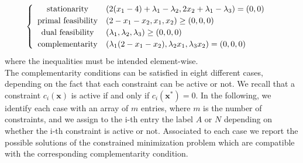 \documentclass[a4paper,11pt]{article}
\begin{document}
\begin{equation}
	\begin{cases}
	\begin{array}{c l}
	\text{stationarity} & (2(x_{1}-4) + \lambda_{1} -\lambda_{2}, 2x_{2}+\lambda_{1}-\lambda_{3}) = (0,0) \\
	\text{primal feasibility} &(2 - x_{1} -x_{2}, x_{1}, x_{2}) \ge (0,0,0) \\
	\text{dual feasibility} & (\lambda_{1}, \lambda_{2}, \lambda_{3}) \ge (0,0,0) \\
	\text{complementarity} &(\lambda_{1}(2-x_{1}-x_{2}), \lambda_{2}x_{1}, \lambda_{3}x_{2}) = (0,0,0)
	\end{array}
	\end{cases}
	\label{eq:KKT system f_a}
\end{equation}
where the inequalities must be intended element-wise.\\

\noindent The complementarity conditions can be satisfied in eight different cases, depending on the fact that each constraint can be active or not. We recall that a constraint $c_{i}(\textbf{x})$ is active if and only if $c_{i}(\textbf{x}^*)=0$.
In the following, we identify each case with an array of $m$ entries, where $m$ is the number of constraints, and we assign to the i-th entry the label $A$ or $N$ depending on whether the i-th constraint is active or not. Associated to each case we report the possible solutions of the constrained minimization problem which are compatible with the corresponding complementarity condition.
\end{document}
